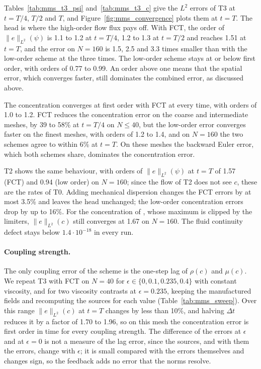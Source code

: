 Tables~\ref{tab:mms_t3_psi} and~\ref{tab:mms_t3_c} give the $L^2$ errors of
T3 at $t=T/4$, $T/2$ and $T$, and Figure~\ref{fig:mms_convergence} plots them
at $t=T$. The head is where the high-order flow flux pays off. With FCT, the
order of $\|e\|_{L^2}(\psi)$ is 1.1 to 1.2 at $t=T/4$, 1.2 to 1.3 at $t=T/2$
and reaches 1.51 at $t=T$, and the error on $N=160$ is 1.5, 2.5 and 3.3 times
smaller than with the low-order scheme at the three times. The low-order
scheme stays at or below first order, with orders of 0.77 to 0.99. An order
above one means that the spatial error, which converges faster, still dominates the
combined error, as discussed above.

The concentration converges at first order with FCT at every time, with
orders of 1.0 to 1.2. FCT reduces the concentration error on the coarse and
intermediate meshes, by 39 to 58\% at $t=T/4$ on $N\le40$, but the low-order
error converges faster on the finest meshes, with orders of 1.2 to 1.4, and on
$N=160$ the two schemes agree to within 6\% at $t=T$. On these meshes the
backward Euler error, which both schemes share, dominates the concentration
error.

T2 shows the same behaviour, with orders of $\|e\|_{L^2}(\psi)$ at $t=T$ of
1.57 (FCT) and 0.94 (low order) on $N=160$; since the flow of T2 does not see
$c$, these are the rates of T0. Adding mechanical dispersion changes the FCT
errors by at most 3.5\% and leaves the head unchanged; the low-order
concentration errors drop by up to 16\%. For the concentration of
\cite{suciu2021}, whose maximum is clipped by the limiters,
$\|e\|_{L^2}(c)$ still converges at 1.67 on $N=160$. The fluid continuity
defect stays below $1.4\cdot10^{-18}$ in every run.

\paragraph{Coupling strength.}
The only coupling error of the scheme is the one-step lag of $\rho(c)$ and
$\mu(c)$. We repeat T3 with FCT on $N=40$ for
$\epsilon\in\{0,0.1,0.235,0.4\}$ with constant viscosity, and for two
viscosity contrasts at $\epsilon=0.235$, keeping the manufactured fields and
recomputing the sources for each value (Table~\ref{tab:mms_sweep}). Over this
range $\|e\|_{L^2}(c)$ at $t=T$ changes by less than 10\%, and halving
$\Delta t$ reduces it by a factor of 1.70 to 1.96, so on this mesh the
concentration error is first order in time for every coupling strength. The
difference of the errors at $\epsilon$ and at $\epsilon=0$ is not a measure of
the lag error, since the sources, and with them the errors, change with
$\epsilon$; it is small compared with the errors themselves and changes sign,
so the feedback adds no error that the norms resolve.

